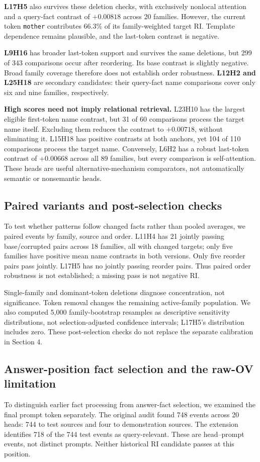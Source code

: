 \documentclass[11pt,a4paper]{article}
\begin{document}
\textbf{L17H5} also survives these deletion checks, with exclusively nonlocal attention and a query-fact contrast of $+0.00818$ across 20 families. However, the current token \texttt{mother} contributes 66.3\% of its family-weighted target RI. Template dependence remains plausible, and the last-token contrast is negative.

\textbf{L9H16} has broader last-token support and survives the same deletions, but 299 of 343 comparisons occur after reordering. Its base contrast is slightly negative. Broad family coverage therefore does not establish order robustness. \textbf{L12H2 and L25H18} are secondary candidates: their query-fact name comparisons cover only six and nine families, respectively.

\textbf{High scores need not imply relational retrieval.} L23H10 has the largest eligible first-token name contrast, but 31 of 60 comparisons process the target name itself. Excluding them reduces the contrast to $+0.00718$, without eliminating it. L15H18 has positive contrasts at both anchors, yet 104 of 110 comparisons process the target name. Conversely, L6H2 has a robust last-token contrast of $+0.00668$ across all 89 families, but every comparison is self-attention. These heads are useful alternative-mechanism comparators, not automatically semantic or nonsemantic heads.

\subsection{Paired variants and post-selection checks}
To test whether patterns follow changed facts rather than pooled averages, we paired events by family, source and order. L11H4 has 21 jointly passing base/corrupted pairs across 18 families, all with changed targets; only five families have positive mean name contrasts in both versions. Only five reorder pairs pass jointly. L17H5 has no jointly passing reorder pairs. Thus paired order robustness is not established; a missing pass is not negative RI.

Single-family and dominant-token deletions diagnose concentration, not significance. Token removal changes the remaining active-family population. We also computed 5,000 family-bootstrap resamples as descriptive sensitivity distributions, not selection-adjusted confidence intervals; L17H5's distribution includes zero. These post-selection checks do not replace the separate calibration in Section 4.

\subsection{Answer-position fact selection and the raw-OV limitation}
To distinguish earlier fact processing from answer-fact selection, we examined the final prompt token separately. The original audit found 748 events across 20 heads: 744 to test sources and four to demonstration sources. The extension identifies 718 of the 744 test events as query-relevant. These are head--prompt events, not distinct prompts. Neither historical RI candidate passes at this position.
\end{document}

